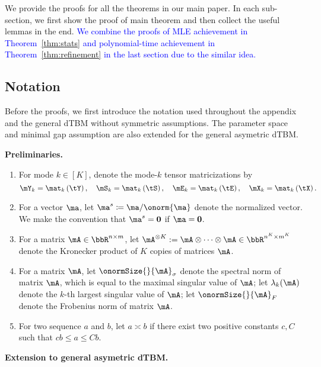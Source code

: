 \documentclass[lettersize,onecolumn,journal]{IEEEtran}
\theoremstyle{definition}
\theoremstyle{definition}
\newcommand{\of}[1]{\left(#1\right)}
\begin{document}
We provide the proofs for all the theorems in our main paper. In each sub-section, we first show the proof of main theorem and then collect the useful lemmas in the end. \textcolor{blue}{We combine the proofs of MLE achievement in Theorem~\ref{thm:stats} and polynomial-time achievement in Theorem~\ref{thm:refinement} in the last section due to the similar idea. }

\subsection{Notation}
Before the proofs, we first introduce the notation used throughout the appendix and the general dTBM without symmetric assumptions. The parameter space and minimal gap assumption are also extended for the general asymetric dTBM. 

{\bf Preliminaries.}
\begin{enumerate}[wide]
    \item For mode $ k \in [K]$, denote the mode-$k$ tensor matricizations by
    \begin{equation}
        \mY_k = \mat_k \of{ \tY }, \quad \mS_k = \mat_k \of{\tS}, \quad \mE_k = \mat_k \of{ \tE}, \quad \mX_k = \mat_k \of{\tX}.
    \end{equation}
    \item For a vector $\ma$, let $\ma^{s} \coloneqq \ma/\onorm{\ma}$ denote the normalized vector. We make the convention that $\ma^s = {\bf 0}$ if $\ma = {\bf 0}$. 
    \item For a matrix $\mA \in \bbR^{n \times m} $, let $\mA^{\otimes K}:=\mA\otimes \cdots \otimes \mA\in \bbR^{n^K \times m^K}$ denote the Kronecker product of $K$ copies of matrices $\mA $.
    \item For a matrix $\mA$, let $\onormSize{}{\mA}_\sigma$ denote the spectral norm of matrix $\mA$, which is equal to the maximal singular value of $\mA$; let $\lambda_k(\mA)$ denote the $k$-th largest singular value of $\mA$; let $\onormSize{}{\mA}_F$ denote the Frobenius norm of matrix $\mA$.
    \item For two sequence $a$ and $b$, let $a \asymp b$ if there exist two positive constants $c, C$ such that $cb \leq a\leq Cb$. 
\end{enumerate}


{\bf Extension to general asymetric dTBM.} 
 
\end{document}
